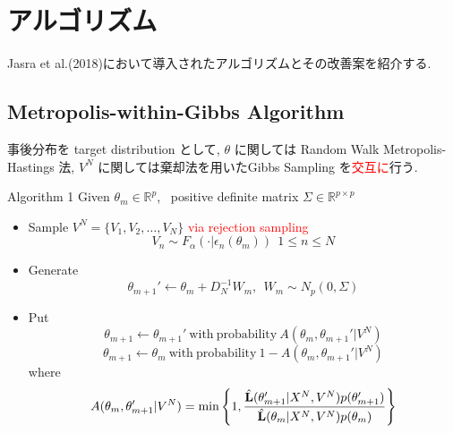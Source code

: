 \documentclass[portrait,a0]{a0poster}
\begin{document}
\section{アルゴリズム}
Jasra et al.(2018)において導入されたアルゴリズムとその改善案を紹介する.
\subsection{Metropolis-within-Gibbs Algorithm}
事後分布を target distribution として, $\theta$ に関しては Random Walk Metropolis-Hastings 法, $V^N$ に関しては棄却法を用いたGibbs Sampling を\textcolor{red}{交互に}行う.
\begin{itembox}[H]{Algorithm 1}
 Given $\theta_{m} \in \mathbb{R}^{p}$, \ positive definite matrix $ \Sigma \in \mathbb{R}^{p \times p}$
\begin{itemize}
    \item Sample $V^{N} =\{V_1,V_2,\ldots,V_{N}\}$ \textcolor{red}{via rejection sampling}
$$V_{n} \sim F_{\alpha}(\cdot|\epsilon_{n} (\theta_{m})) \ \ 
1 \le n \le N $$
\item Generate
$$
\theta_{m+1}'  \gets \theta_{m} + D_{N}^{-1}W_{m}, \ \ W_{m} \sim N_{p}(0,\Sigma)
$$
\item Put
$$\theta_{m+1} \gets \theta_{m+1}' \ \mathrm{with \ probability} \ A(\theta_{m},\theta_{m+1}'|V^{N})$$
$$\theta_{m+1} \gets \theta_{m} \ \mathrm{with \ probability} \ 1-A(\theta_{m},\theta_{m+1}'|V^{N})$$
where 
$$
A(\theta_{m},\theta'_{m+1}|V^{N}) =  \min\left\{
1 ,\frac
{ \Hat{\mathbf{L}}(\theta_{m+1}'|X^{N},V^{N})p(\theta_{m+1}')}
{ \Hat{\mathbf{L}}(\theta_{m}|X^{N},V^{N})p(\theta_{m})}
\right\}
$$
\end{itemize}
\end{itembox}
\end{document}
